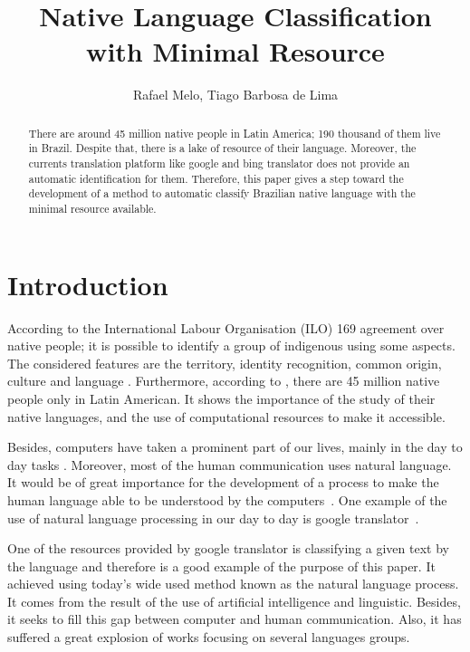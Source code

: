 \documentclass[12pt]{article}
\title{Native Language Classification\\ with Minimal Resource}
\author{Rafael Melo\inst{1}, Tiago Barbosa de Lima\inst{1}}
\begin{document}
\maketitle

\begin{abstract}
   There are around 45 million native people in Latin America; 190 thousand of them live in Brazil. Despite that, there is a lake of resource of their language. Moreover, the currents translation platform like google and bing translator does not provide an automatic identification for them. Therefore, this paper gives a step toward the development of a method to automatic classify Brazilian native language with the minimal resource available.
\end{abstract}


\section{Introduction}\label{sec:introduction}

According to the International Labour Organisation (ILO) 169 agreement over native people; it is possible to identify a group of indigenous using some aspects.
The considered features are the territory, identity recognition, common origin, culture and language \cite{povos_indigenas}.
Furthermore, according to \cite{povos_indigenas}, there are 45 million native people only in Latin American.
It shows the importance of the study of their native languages, and the use of computational resources to make it accessible.

Besides, computers have taken a prominent part of our lives, mainly in the day to day tasks \cite{matthews2016introduction}. 
Moreover, most of the human communication uses natural language\cite{matthews2016introduction}. 
It would be of great importance for the development of a process to make the human language able to be understood by the computers~\cite{matthews2016introduction}.
One example of the use of natural language processing in our day to day is google translator~\cite{google}.

One of the resources provided by google translator is classifying a given text by the language and therefore is a good example of the purpose of this paper. 
It achieved using today's wide used method known as the natural language process.
It comes from the result of the use of artificial intelligence and linguistic\cite{10.1136/amiajnl-2011-000464}.
Besides, it seeks to fill this gap between computer and human communication.
 Also, it has suffered a great explosion of works focusing on several languages groups\cite{peters2002evaluation}.
\end{document}
